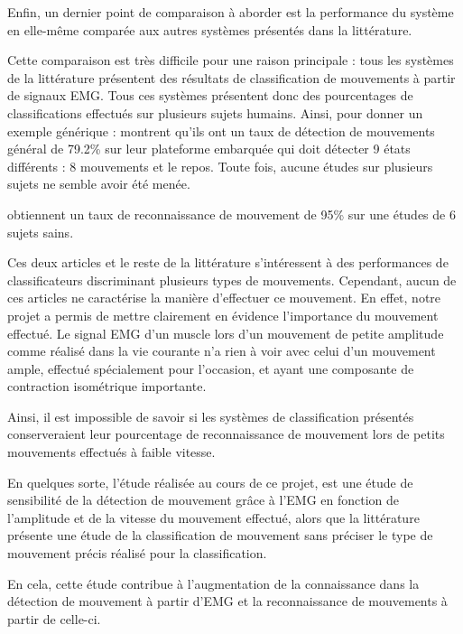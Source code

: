 \documentclass[letterpaper, twoside, 12pt, memoire, creativecommons, hyperref]{thETS}
\begin{document}
Enfin, un dernier point de comparaison à aborder est la performance du système en elle-même comparée aux autres systèmes présentés dans la littérature. 

Cette comparaison est très difficile pour une raison principale : tous les systèmes de la littérature présentent des résultats de classification de mouvements à partir de signaux EMG. Tous ces systèmes présentent donc des pourcentages de classifications effectués sur plusieurs sujets humains. Ainsi, pour donner un exemple générique : \cite{Tenore2007} montrent qu'ils ont un taux de détection de mouvements général de 79.2\% sur leur plateforme embarquée qui doit détecter 9 états différents : 8 mouvements et le repos. Toute fois, aucune études sur plusieurs sujets ne semble avoir été menée. 

\cite{Chang1996} obtiennent un taux de reconnaissance de mouvement de 95\% sur une études de 6 sujets sains.

Ces deux articles et le reste de la littérature s'intéressent à des performances de classificateurs discriminant plusieurs types de mouvements. Cependant, aucun de ces articles ne caractérise la manière d'effectuer ce mouvement. En effet, notre projet a permis de mettre clairement en évidence l'importance du mouvement effectué. Le signal EMG d'un muscle lors d'un mouvement de petite amplitude comme réalisé dans la vie courante n'a rien à voir avec celui d'un mouvement ample, effectué spécialement pour l'occasion, et ayant une composante de contraction isométrique importante. 

Ainsi, il est impossible de savoir si les systèmes de classification présentés conserveraient leur pourcentage de reconnaissance de mouvement lors de petits mouvements effectués à faible vitesse.

En quelques sorte, l'étude réalisée au cours de ce projet, est une étude de sensibilité de la détection de mouvement grâce à l'EMG en fonction de l'amplitude et de la vitesse du mouvement effectué, alors que la littérature présente une étude de la classification de mouvement sans préciser le type de mouvement précis réalisé pour la classification. 

En cela, cette étude contribue à l'augmentation de la connaissance dans la détection de mouvement à partir d'EMG et la reconnaissance de mouvements à partir de celle-ci.
\end{document}
